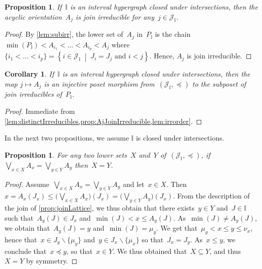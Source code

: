\documentclass{amsart}
\newtheorem{corollary}[theorem]{Corollary}
\newtheorem{proposition}[theorem]{Proposition}
\theoremstyle{definition}
\newcommand{\cal}[1]{\mathcal{#1}} %
\newcommand{\set}[2]{\left\{ #1 \;\middle|\; #2 \right\}} %
\newcommand{\ssm}{\smallsetminus} %
\newcommand{\bigJoin}{\bigvee} %
\newcommand{\II}{\mathbb I} %
\newcommand{\cJ}{\cal{J}} %
\begin{document}
\begin{proposition}
\label{prop:AjJoinIrreducible}
If~$\II$ is an interval hypergraph closed under intersections, then the acyclic orientation~$A_j$ is join irreducible for any~$j\in \cJ_\II$.
\end{proposition}

\begin{proof}
By \cref{lem:subirr}, the lower set of~$A_j$ in~$P_\II$ is the chain $\min(P_\II) < A_{i_1} < \dots < A_{i_p} < A_j$ where~$\{i_1 < \dots < i_p\} = \set{i \in \cJ_\II}{J_i = J_j \text{ and } i < j}$.
Hence, $A_j$ is join irreducible.
\end{proof}

\begin{corollary}
\label{coro:irreduciblePosetMorphism}
If~$\II$ is an interval hypergraph closed under intersections, then the map $j \mapsto A_j$ is an injective poset morphism from~$(\cJ_\II, \preccurlyeq)$ to the subposet of join irreducibles of~$P_\II$.
\end{corollary}

\begin{proof}
Immediate from \cref{lem:distinctIrreducibles,prop:AjJoinIrreducible,lem:irrorder}.
\end{proof}

In the next two propositions, we assume $\II$ is closed under intersections.
\begin{proposition}
\label{prop:injectivityDistributive}
For any two lower sets~$X$ and~$Y$ of~$(\cJ_\II, \preccurlyeq)$, if~$\bigJoin\limits_{x \in X} A_x = \bigJoin\limits_{y \in Y} A_y$ then~$X = Y$.
\end{proposition}

\begin{proof}
Assume~$\bigJoin\limits_{x \in X} A_x = \bigJoin\limits_{y \in Y} A_y$ and let~$x \in X$.
Then $x = A_x(J_x) \le \big( \bigJoin\limits_{x \in X} A_x \big)(J_x) = \big( \bigJoin\limits_{y \in Y} A_y \big)(J_x)$.
From the description of the join of \cref{prop:joinLattice}, we thus obtain that there exists~$y \in Y$ and~$J \in \II$ such that~$A_y(J) \in J_x$ and~$\min(J) < x \le A_y(J)$.
As~$\min(J) \ne A_y(J)$, we obtain that~$A_y(J) = y$ and~$\min(J) = \mu_y$.
We get that~$\mu_y < x \le y \le \nu_x$, hence that~$x \in J_y \ssm \{\mu_y\}$ and~$y \in J_x \ssm \{\mu_x\}$ so that~$J_x = J_y$.
As~$x \le y$, we conclude that~$x \preccurlyeq y$, so that~$x \in Y$.
We thus obtained that~$X \subseteq Y$, and thus~$X = Y$ by symmetry.
\end{proof}
\end{document}
